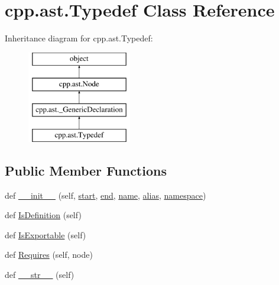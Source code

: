 \hypertarget{classcpp_1_1ast_1_1Typedef}{}\section{cpp.\+ast.\+Typedef Class Reference}
\label{classcpp_1_1ast_1_1Typedef}
Inheritance diagram for cpp.\+ast.\+Typedef\+:\begin{figure}[H]
\begin{center}
\leavevmode
\includegraphics[height=4.000000cm]{classcpp_1_1ast_1_1Typedef}
\end{center}
\end{figure}
\subsection*{Public Member Functions}
\begin{DoxyCompactItemize}
\item 
def \mbox{\hyperlink{classcpp_1_1ast_1_1Typedef_af3275d2390190a074de470c1424e05e0}{\+\_\+\+\_\+init\+\_\+\+\_\+}} (self, \mbox{\hyperlink{classcpp_1_1ast_1_1Node_a7b2aa97e6a049bb1a93aea48c48f1f44}{start}}, \mbox{\hyperlink{classcpp_1_1ast_1_1Node_a3c5e5246ccf619df28eca02e29d69647}{end}}, \mbox{\hyperlink{classcpp_1_1ast_1_1__GenericDeclaration_af774f4729dfd78d0538a6782fe8514c1}{name}}, \mbox{\hyperlink{classcpp_1_1ast_1_1Typedef_a3187a504dfbefe50b866b44902823c30}{alias}}, \mbox{\hyperlink{classcpp_1_1ast_1_1__GenericDeclaration_a8aee3f11b37449d54b42a78e0a689f46}{namespace}})
\item 
def \mbox{\hyperlink{classcpp_1_1ast_1_1Typedef_a103bf391e665884bfbfd20fc5e6d1a19}{Is\+Definition}} (self)
\item 
def \mbox{\hyperlink{classcpp_1_1ast_1_1Typedef_adee58e4674b049d8e4435b5b6ad8e1d4}{Is\+Exportable}} (self)
\item 
def \mbox{\hyperlink{classcpp_1_1ast_1_1Typedef_aa9f65f4a97ba340f2c9ebc5e7ce27e8c}{Requires}} (self, node)
\item 
def \mbox{\hyperlink{classcpp_1_1ast_1_1Typedef_a451920900affc5f12e38ab8fbf5e3dea}{\+\_\+\+\_\+str\+\_\+\+\_\+}} (self)
\end{DoxyCompactItemize}

